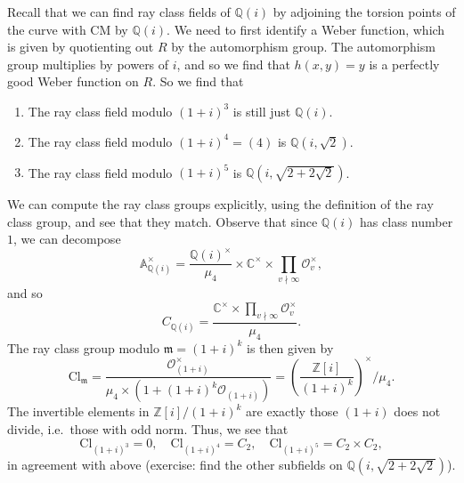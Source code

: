\documentclass{shortart}
\theoremstyle{definition}
\newcommand\A{\mathbb{A}}
\newcommand\C{\mathbb{C}}
\newcommand\Z{\mathbb{Z}}
\newcommand\Q{\mathbb{Q}}
\newcommand\Cl{\mathrm{Cl}}
\begin{document}
Recall that we can find ray class fields of $\Q(i)$ by adjoining the torsion points of the curve with CM by $\Q(i)$. We need to first identify a Weber function, which is given by quotienting out $R$ by the automorphism group. The automorphism group multiplies by powers of $i$, and so we find that $h(x, y) = y$ is a perfectly good Weber function on $R$. So we find that
\begin{enumerate}
  \item The ray class field modulo $(1 + i)^3$ is still just $\Q(i)$.
  \item The ray class field modulo $(1 + i)^4 = (4)$ is $\Q(i, \sqrt{2})$.
  \item The ray class field modulo $(1 + i)^5$ is $\Q(i, \sqrt{2 + 2 \sqrt{2}})$.
\end{enumerate}
We can compute the ray class groups explicitly, using the definition of the ray class group, and see that they match. Observe that since $\Q(i)$ has class number $1$, we can decompose
\[
  \A_{\Q(i)}^\times = \frac{\Q(i)^\times}{\mu_4} \times \C^\times \times \prod_{v \nmid \infty} \mathcal{O}_v^\times,
\]
and so
\[
  C_{\Q(i)} = \frac{\C^\times \times \prod_{v \nmid \infty} \mathcal{O}_v^\times}{\mu_4}.
\]
The ray class group modulo $\mathfrak{m} = (1 + i)^k$ is then given by
\[
  \Cl_\mathfrak{m} = \frac{\mathcal{O}_{(1 + i)}^\times}{\mu_4 \times (1 + (1 + i)^k \mathcal{O}_{(1 + i)})} = \left(\frac{\Z[i]}{(1 + i)^k}\right)^\times \Big/ \mu_4.
\]
The invertible elements in $\Z[i]/(1 + i)^k$ are exactly those $(1 + i)$ does not divide, i.e.\ those with odd norm. Thus, we see that
\[
  \Cl_{(1 + i)^3} = 0,\quad \Cl_{(1 + i)^4} = C_2,\quad \Cl_{(1 + i)^5} = C_2 \times C_2,
\]
in agreement with above (exercise: find the other subfields on $\Q(i, \sqrt{2 + 2\sqrt{2}})$).
\end{document}

